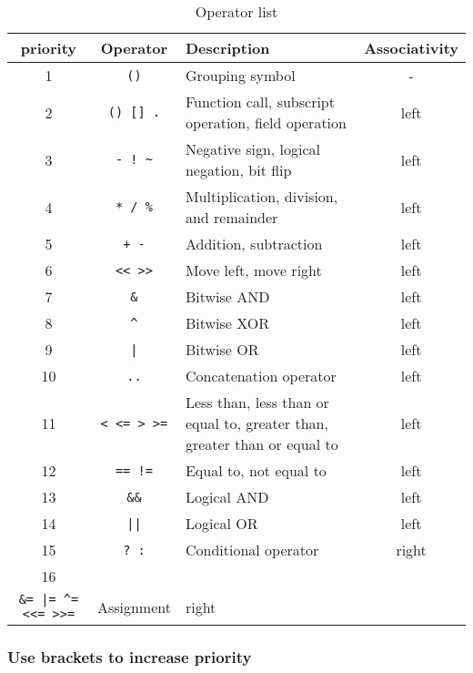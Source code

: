 \begin{table}[htb]
    \centering
    \setlength{\tabcolsep}{3mm}
    \begin{tabular}{cclc} \toprule
        \textbf{priority} & \textbf{Operator} & \textbf{Description} & \textbf{Associativity} \\ \midrule
        1 & \texttt{()} & Grouping symbol & - \\
        2 & \texttt{() [] .} & Function call, subscript operation, field operation & left \\
        3 & \texttt{- ! \textasciitilde} & Negative sign, logical negation, bit flip & left \\
        4 & \texttt{* / \%} & Multiplication, division, and remainder & left \\
        5 & \texttt{+ -} & Addition, subtraction & left \\
        6 & \texttt{<< >>} & Move left, move right & left \\
        7 & \texttt{\&} & Bitwise AND & left \\
        8 & \texttt{\textasciicircum} & Bitwise XOR & left \\
        9 & \texttt{|} & Bitwise OR & left \\
        10 & \texttt{..} & Concatenation operator & left \\
        11 & \texttt{< <= > >=} & Less than, less than or equal to, greater than, greater than or equal to & left \\
        12 & \texttt{== !=} & Equal to, not equal to & left \\
        13 & \texttt{\&\&} & Logical AND & left \\
        14 & \texttt{||} & Logical OR & left \\
        15 & \texttt{? :} & Conditional operator & right \\
        16 & \makecell{\texttt{= += -= *= /= \%=} \\
                       \texttt{\&= |= \textasciicircum= <<= >>=}} & Assignment & right \\
        \bottomrule
    \end{tabular}
    \caption{Operator list}
    \label{tab::operator_list}
\end{table}

\subsubsection {Use brackets to increase priority}

